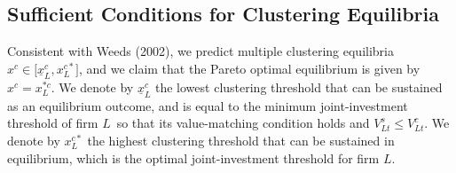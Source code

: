 \documentclass[nogrid,nosurname,sort&compress]{RFS}
\begin{document}

\subsection{Sufficient Conditions for Clustering Equilibria}

Consistent with Weeds (2002), we predict multiple clustering equilibria $%
x^{c}\in \lbrack \underline{x}_{L}^{c},x_{L}^{c\ast }]$, and we claim that the Pareto optimal
equilibrium is given by $x^{c}=x_{L}^{\ast c}$. We denote by $\underline{x}_{L}^{c}$ the lowest
clustering threshold that can be sustained as an equilibrium outcome, and is equal to the minimum
joint-investment threshold of firm $L$\ so that its value-matching condition holds and
$V_{Lt}^{s}\leq V_{Lt}^{c}$. We denote by $x_{L}^{c\ast }$ the highest clustering threshold that
can be sustained in equilibrium, which is the optimal joint-investment threshold for firm $L$.
\end{document}
